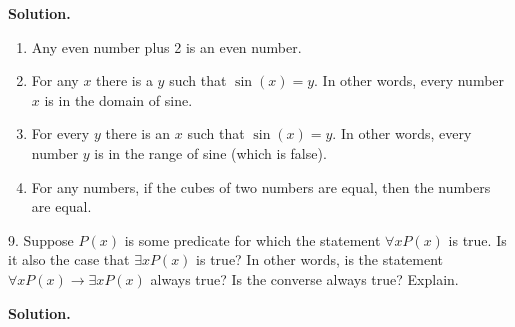 \documentclass[10pt,]{book}
\theoremstyle{plain}
\theoremstyle{definition}
\theoremstyle{definition}
\theoremstyle{definition}
\def\imp{\rightarrow}
\begin{document}
\begin{exerciselist}
\par\smallskip
\par\smallskip
\noindent\textbf{Solution.}\hypertarget{solution-14}{}\quad
\leavevmode%
\begin{enumerate}[label=(\alph*)]
\item\hypertarget{li-141}{} Any even number plus 2 is an even number. %
\item\hypertarget{li-142}{} For any \(x\) there is a \(y\) such that \(\sin(x) = y\). In other words, every number \(x\) is in the domain of sine. %
\item\hypertarget{li-143}{} For every \(y\) there is an \(x\) such that \(\sin(x) = y\). In other words, every number \(y\) is in the range of sine (which is false). %
\item\hypertarget{li-144}{} For any numbers, if the cubes of two numbers are equal, then the numbers are equal. %
\end{enumerate}
\item[9.]\hypertarget{exercise-9}{}
          Suppose \(P(x)\) is some predicate for which the statement \(\forall x P(x)\) is true. Is it also the case that \(\exists x P(x)\) is true? In other words, is the statement \(\forall x P(x) \imp \exists x P(x)\) always true? Is the converse always true? Explain.
\par\smallskip
\par\smallskip
\noindent\textbf{Solution.}\hypertarget{solution-15}{}\quad


\end{exerciselist}
\end{document}
